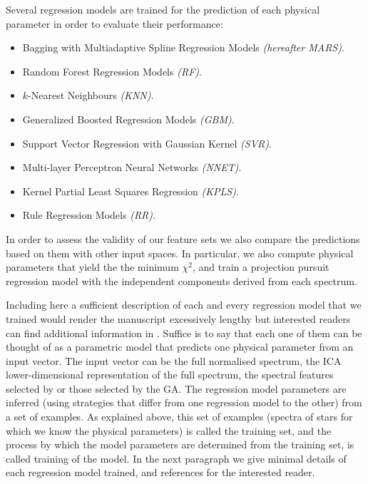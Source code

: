 Several regression models are trained for the prediction of each
physical parameter in order to evaluate their performance:

\begin{itemize}

\item {Bagging with Multiadaptive Spline Regression Models \emph{(hereafter MARS)}.}

\item {Random Forest Regression Models \emph{(RF)}.}

\item {$k$-Nearest Neighbours \emph{(KNN)}.}

\item {Generalized Boosted Regression Models \emph{(GBM)}.}

\item {Support Vector Regression with Gaussian Kernel \emph{(SVR)}.}

\item {Multi-layer Perceptron Neural Networks \emph{(NNET)}.}

\item {Kernel Partial Least Squares Regression \emph{(KPLS)}.}

\item {Rule Regression Models \emph{(RR)}.}

\end{itemize}

In order to assess the validity of our feature sets we also compare
the predictions based on them with other input spaces. In particular,
we also compute physical parameters that yield the the minimum
$\chi^2$, and train a projection pursuit regression model with the
independent components \citep{Hyvarinen:1998:NAD:302528.302606}
derived from each spectrum.

Including here a sufficient description of each and every regression
model that we trained would render the manuscript excessively lengthy
but interested readers can find additional information in
\cite{baraud2002model,geman1992neural,elith2008working,
meyer2003support,svetnik2003random}. 
Suffice is to say that each one of them can be thought of as
a parametric model that predicts one physical parameter from an input
vector. The input vector can be the full normalised spectrum, the ICA
lower-dimensional representation of the full spectrum, the spectral
features selected by \cite{cesetti} or those selected by the GA. The
regression model parameters are inferred (using strategies that differ
from one regression model to the other) from a set of examples. As
explained above, this set of examples (spectra of stars for which we
know the physical parameters) is called the training set, and the
process by which the model parameters are determined from the training
set, is called training of the model. In the next paragraph we give
minimal details of each regression model trained, and references for
the interested reader.

